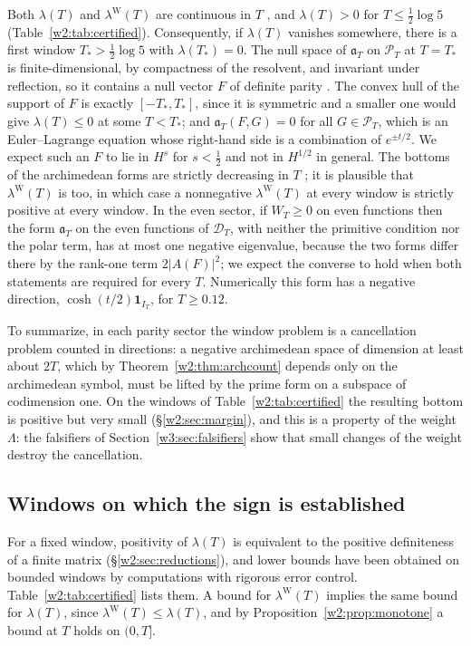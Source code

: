 \documentclass[11pt]{amsart}
\theoremstyle{definition}
\theoremstyle{remark}
\numberwithin{equation}{section}
\newcommand{\IT}{I_T}                                  %
\newcommand{\PT}{\mathcal{P}_T}                        %
\newcommand{\DT}{\mathcal{D}_T}                        %
\newcommand{\aT}{\mathfrak{a}_T}                       %
\newcommand{\WT}{W_T}                                  %
\newcommand{\lam}{\lambda(T)}                          %
\newcommand{\lamW}{\lambda^{\mathrm W}(T)}             %
\newcommand{\Tst}{T_{*}}                               %
\begin{document}
Both $\lam$ and $\lamW$ are continuous in $T$ \cite[Lemma~3.10]{P46}, and $\lam>0$ for $T\le\frac12\log5$
(Table~\ref{w2:tab:certified}). Consequently, if $\lam$ vanishes somewhere, there is a first window $\Tst>\frac12\log5$
with $\lambda(\Tst)=0$. The null space of $\aT$ on $\PT$ at $T=\Tst$ is finite-dimensional, by compactness of the
resolvent, and invariant under reflection, so it contains a null vector $F$ of definite parity
\cite[Lemma~10.17]{P46}. The convex hull of the support of $F$ is exactly $[-\Tst,\Tst]$, since it is symmetric and a
smaller one would give $\lambda(T)\le0$ at some $T<\Tst$; and $\aT(F,G)=0$ for all $G\in\PT$, which is an
Euler--Lagrange equation whose right-hand side is a combination of $e^{\pm t/2}$. We expect such an $F$ to lie in
$H^s$ for $s<\frac12$ and not in $H^{1/2}$ in general. The bottoms of the archimedean forms are strictly decreasing in
$T$ \cite[Lemma~7.5]{P46}; it is plausible that $\lamW$ is too, in which case a nonnegative $\lamW$ at every window is
strictly positive at every window. In the even sector, if $\WT\ge0$ on even functions then the form $\aT$ on the even
functions of $\DT$, with neither the primitive condition nor the polar term, has at most one negative eigenvalue,
because the two forms differ there by the rank-one term $2|A(F)|^2$; we expect the converse to hold when both statements
are required for every $T$. Numerically this form has a negative direction, $\cosh(t/2)\mathbf 1_{\IT}$, for
$T\ge0.12$.

To summarize, in each parity sector the window problem is a cancellation problem counted in directions: a negative
archimedean space of dimension at least about $2T$, which by Theorem~\ref{w2:thm:archcount} depends only on the
archimedean symbol, must be lifted by the prime form on a subspace of codimension one. On the windows of
Table~\ref{w2:tab:certified} the resulting bottom is positive but very small (\S\ref{w2:sec:margin}), and this is a
property of the weight $\Lambda$: the falsifiers of
Section~\ref{w3:sec:falsifiers} show that small changes of the weight destroy the cancellation.

\subsection{Windows on which the sign is established}\label{w2:sec:certified}

For a fixed window, positivity of $\lam$ is equivalent to the positive definiteness of a finite matrix
(\S\ref{w2:sec:reductions}), and lower bounds have been obtained on bounded windows by computations with rigorous error
control. Table~\ref{w2:tab:certified} lists them. A bound for $\lamW$ implies the same bound for $\lam$, since
$\lamW\le\lam$, and by Proposition~\ref{w2:prop:monotone} a bound at $T$ holds on $(0,T]$.
\end{document}
